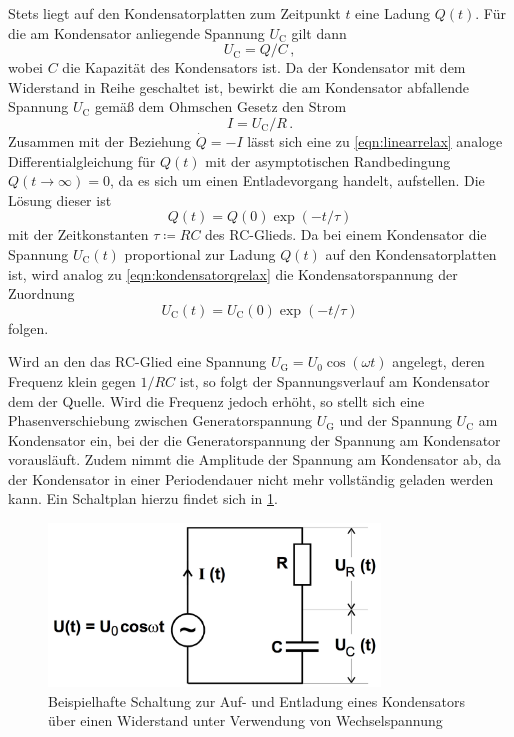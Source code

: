 Stets liegt auf den Kondensatorplatten zum Zeitpunkt $t$ eine Ladung $Q(t)$. Für
die am Kondensator anliegende Spannung $U_{\text{C}}$ gilt dann
\begin{equation}
  U_{\text{C}} = Q / C\,,
\end{equation}
wobei $C$ die Kapazität des Kondensators ist. Da der Kondensator mit dem Widerstand
in Reihe geschaltet ist, bewirkt die am Kondensator abfallende Spannung $U_{\text{C}}$
gemäß dem Ohmschen Gesetz den Strom
\begin{equation}
  I = U_{\text{C}} / R\,.
\end{equation}
Zusammen mit der Beziehung $\dot{Q} = -I$ lässt sich eine zu \eqref{eqn:linearrelax}
analoge Differentialgleichung für $Q(t)$ mit der asymptotischen Randbedingung
$Q(t \to \infty) = 0$, da es sich um einen Entladevorgang handelt, aufstellen. Die
Lösung dieser ist
\begin{equation}
  Q(t) = Q(0) \exp(-t/\tau)
  \label{eqn:kondensatorqrelax}
\end{equation}
mit der Zeitkonstanten $\tau \coloneqq RC$ des RC-Glieds.
Da bei einem Kondensator die Spannung $U_\text{C}(t)$ proportional zur Ladung
$Q(t)$ auf den Kondensatorplatten ist, wird analog zu \eqref{eqn:kondensatorqrelax}
die Kondensatorspannung der Zuordnung
\begin{equation}
  U_\text{C}(t) = U_\text{C}(0) \exp(-t/\tau)
  \label{eqn:kondensatorurelax}
\end{equation}
folgen.


Wird an den das RC-Glied eine Spannung $U_{\text{G}}=U_{\text{0}}\cos(\omega t)$ angelegt, deren
Frequenz klein gegen $1/RC$ ist, so folgt der Spannungsverlauf am Kondensator
dem der Quelle. Wird die Frequenz jedoch erhöht, so stellt sich eine Phasenverschiebung
zwischen Generatorspannung $U_{\text{G}}$ und der Spannung $U_{\text{C}}$ am Kondensator
ein, bei der die Generatorspannung der Spannung am Kondensator vorausläuft.
Zudem nimmt die Amplitude der Spannung am Kondensator ab, da der Kondensator in einer
Periodendauer nicht mehr vollständig geladen werden kann. Ein Schaltplan hierzu findet
sich in \ref{fig:Aufbau_2}.
\begin{figure}
  \centering
  \includegraphics[width=250pt]{aufbau_2.png}
  \caption{Beispielhafte Schaltung zur Auf- und Entladung eines Kondensators über
  einen Widerstand unter Verwendung von Wechselspannung \cite{Versuchsanleitung}}
  \label{fig:Aufbau_2}
\end{figure}


